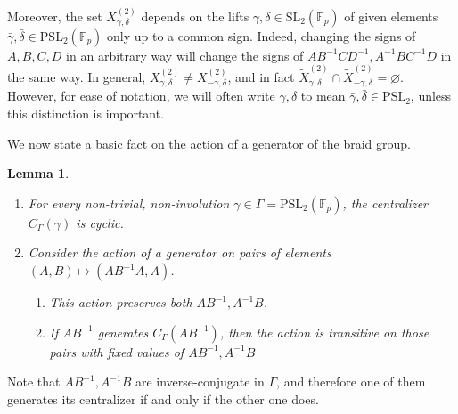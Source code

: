 \documentclass[letterpaper]{amsart}
\newtheorem{lemma}[theorem]{Lemma}
\begin{document}
Moreover, the set $X_{\gamma, \delta}^{(2)}$ depends on the lifts $\gamma, \delta \in \mathrm{SL}_2(\mathbb{F}_p)$ of given elements $\bar{\gamma},\bar{\delta} \in \mathrm{PSL}_2(\mathbb{F}_p)$ only up to a common sign. Indeed, changing the signs of $A,B,C,D$ in an arbitrary way will change the signs of $AB^{-1}CD^{-1},A^{-1}BC^{-1}D$ in the same way. In general, $X_{\gamma, \delta}^{(2)} \neq X_{-\gamma,\delta}^{(2)}$, and in fact $\tilde{X}_{\gamma,\delta}^{(2)} \cap \tilde{X}^{(2)}_{-\gamma, \delta} = \varnothing$. However, for ease of notation, we will often write $\gamma,\delta$ to mean $\bar{\gamma},\bar{\delta} \in \mathrm{PSL}_2$, unless this distinction is important.

We now state a basic fact on the action of a generator of the braid group.
\begin{lemma}
\label{Action of single generator}
\begin{enumerate}
\item For every non-trivial, non-involution $\gamma \in \Gamma = \mathrm{PSL}_2(\mathbb{F}_p)$, the centralizer $C_\Gamma(\gamma)$ is cyclic.
\item Consider the action of a generator on pairs of elements $(A,B) \mapsto (AB^{-1}A,A)$.
    \begin{enumerate}
    \item This action preserves both $AB^{-1},A^{-1}B$.
    \item If $AB^{-1}$ generates $C_\Gamma(AB^{-1})$, then the action is transitive on those pairs with fixed values of $AB^{-1}, A^{-1}B$
    \end{enumerate}
\end{enumerate}
\end{lemma}
Note that $AB^{-1},A^{-1}B$ are inverse-conjugate in $\Gamma$, and therefore one of them generates its centralizer if and only if the other one does.
\end{document}

